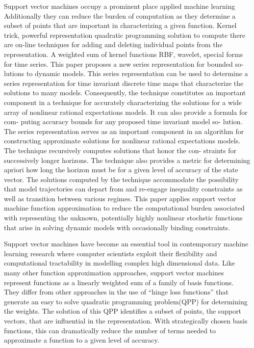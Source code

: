 \documentclass[12pt]{article}
\begin{document}
Support vector machines occupy a prominent place applied machine learning
Additionally they can reduce the burden of computation as they determine 
a subset of points that are important in characterizing a given function.
Kernel trick,  powerful representation quadratic programming solution to compute there are on-line techniques for adding and deleting individual points from the representation.  A weighted sum of kernel functions RBF, wavelet, special forms for time series.
  This paper proposes a new series representation for bounded so-
lutions to dynamic models. This series representation can be used
to determine a series representation for time invariant discrete time
maps that characterize the solutions to many models. Consequently,
the technique constitutes an important component in a technique for
accurately characterizing the solutions for a wide array of nonlinear
rational expectations models. It can also provide a formula for com-
puting accuracy bounds for any proposed time invariant model so-
lution. The series representation serves as an important component
in an algorithm for constructing approximate solutions for nonlinear
rational expectations models.
The technique recursively computes solutions that honor the con-
straints for successively longer horizons. The technique also provides
a metric for determining apriori how long the horizon must be for a
given level of accuracy of the state vector. The solutions computed by
the technique accommodate the possibility that model trajectories can
depart from and re-engage inequality constraints as well as transition
between various regimes.
This paper applies support vector machine function approximation to
reduce the computational burden associated with representing the
unknown, potentially highly nonlinear stochstic functions that arise in
solving dynamic models with occasionally binding constraints.


Support vector machines 
have become an essential tool in contemporary machine learning research
where computer scientists exploit their flexibility and
computational tractability in modelling complex high dimensional data.
Like many other function approximation approaches,
support vector machines represent functions as a linearly weighted sum
of a family of basis functions.  They differ from other approaches in  the
use of ``hinge loss functions'' that generate
an easy to solve
quadratic programming problem(QPP) for determining the weights.
The solution of this QPP identifies a subset of points, the support vectors,
that are influential in the representation.  With strategically chosen
basis functions, this can dramatically reduce the number of terms needed
to approximate a function to a given level of accuracy.
\end{document}
